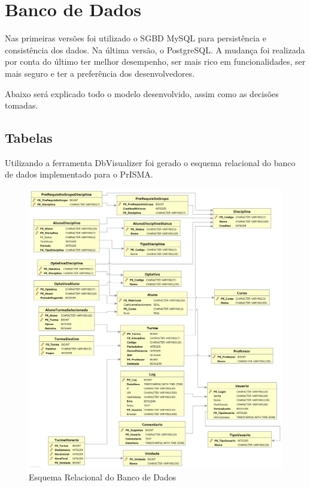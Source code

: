 \documentclass[graduacao,brazil]{ThesisPUC}
\begin{document}
\section{Banco de Dados}

Nas primeiras versões foi utilizado o SGBD MySQL para persistência e consistência dos dados. Na última versão, o PostgreSQL. A mudança foi realizada por conta do último ter melhor desempenho, ser mais rico em funcionalidades, ser mais seguro e ter a preferência dos desenvolvedores.

Abaixo será explicado todo o modelo desenvolvido, assim como as decisões tomadas.

\subsection{Tabelas}

Utilizando a ferramenta DbVisualizer\cite{DbVisualizer} foi gerado o esquema relacional do banco de dados implementado para o PrISMA.

\begin{figure}[H]
    \centering
    \includegraphics[width=0.98\linewidth]{img/dbvisualizer.png}
    \caption{Esquema Relacional do Banco de Dados}
\end{figure}
\end{document}
